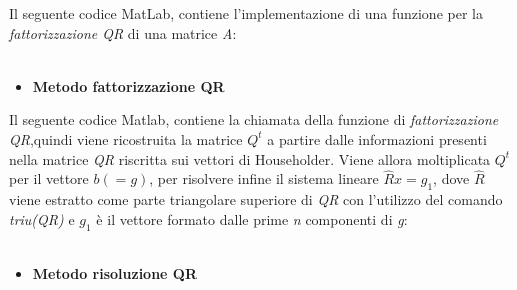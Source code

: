 Il seguente codice MatLab, contiene l'implementazione di una funzione per la \textit{fattorizzazione QR} di una matrice \textit{A}:\\\
\begin{itemize}
\item \textbf{Metodo fattorizzazione QR}

\end{itemize}
Il seguente codice Matlab, contiene la chiamata della funzione di \textit{fattorizzazione QR},quindi viene ricostruita la matrice $Q^t$ a partire dalle informazioni presenti nella matrice \textit{QR} riscritta sui vettori di Householder. Viene allora moltiplicata $Q^t$ per il vettore $b(=g)$, per risolvere infine il sistema lineare $\hat{R}x=g_1$, dove $\hat{R}$ viene
estratto come parte triangolare superiore di \textit{QR} con l'utilizzo del comando \textit{triu(QR)} e $g_1$ è il vettore formato dalle prime \textit{n} componenti di \textit{g}: \\\
\begin{itemize}
\item \textbf{Metodo risoluzione QR}

\end{itemize}